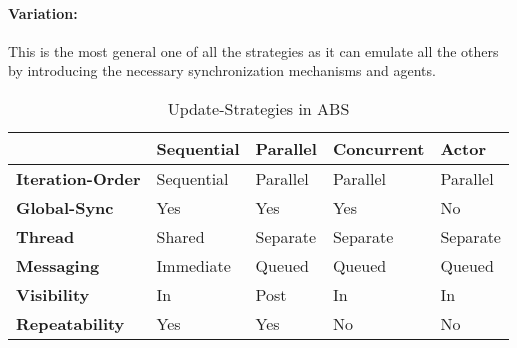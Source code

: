 \paragraph{Variation:} This is the most general one of all the strategies as it can emulate all the others by introducing the necessary synchronization mechanisms and agents.


\begin{table*}[t]
\centering
\caption{Update-Strategies in ABS}
\label{tab:update_strategies}
\begin{tabular}{l || l | l | l | l }
	 			& \textbf{Sequential} 	& \textbf{Parallel} 	& \textbf{Concurrent}	& \textbf{Actor}  	\\ \hline \hline

\textbf{Iteration-Order}	& Sequential	& Parallel	& Parallel		& Parallel	\\  
\textbf{Global-Sync}		& Yes			& Yes		& Yes			& No		\\  
\textbf{Thread}				& Shared		& Separate	& Separate		& Separate	\\  
\textbf{Messaging}			& Immediate		& Queued	& Queued		& Queued	\\  
\textbf{Visibility}			& In			& Post		& In			& In		\\  
\textbf{Repeatability}		& Yes			& Yes		& No			& No		\\ 

\end{tabular}
\end{table*}